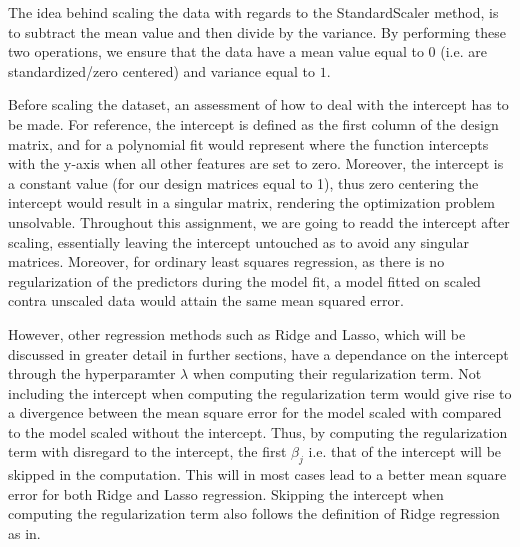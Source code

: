 \documentclass[11pt, a4paper]{article}
\begin{document}
The idea behind scaling the data with regards to the StandardScaler method, is to subtract the mean value and then divide by the variance. By performing these two operations, we ensure that the data have a mean value equal to $0$ (i.e. are standardized/zero centered) and variance equal to $1$.

Before scaling the dataset, an assessment of how to deal with the intercept has to be made. For reference, the intercept is defined as the first column of the design matrix, and for a polynomial fit would represent where the function intercepts with the y-axis when all other features are set to zero. Moreover, the intercept is a constant value (for our design matrices equal to 1), thus zero centering the intercept would result in a singular matrix, rendering the optimization problem unsolvable. Throughout this assignment, we are going to readd the intercept after scaling, essentially leaving the intercept untouched as to avoid any singular matrices. Moreover, for ordinary least squares regression, as there is no regularization of the predictors during the model fit, a model fitted on scaled contra unscaled data would attain the same mean squared error.

However, other regression methods such as Ridge and Lasso, which will be discussed in greater detail in further sections, have a dependance on the intercept through the hyperparamter $\lambda$ when computing their regularization term. Not including the intercept when computing the regularization term would give rise to a divergence between the mean square error for the model scaled with compared to the model scaled without the intercept. Thus, by computing the regularization term with disregard to the intercept, the first $\beta_j$ i.e. that of the intercept will be skipped in the computation. This will in most cases lead to a better mean square error for both Ridge and Lasso regression. Skipping the intercept when computing the regularization term also follows the definition of Ridge regression as in. \cite{Geron2019}
\end{document}
